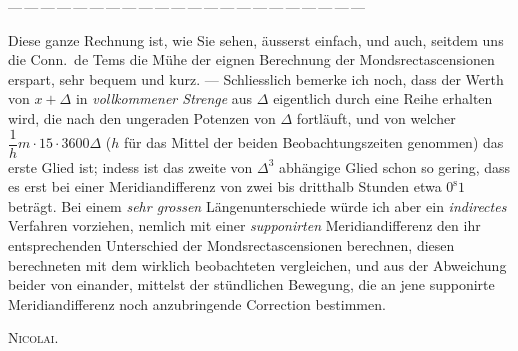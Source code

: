 \begin{center}
{\small ---\,---\,---\,---\,---\,---\,---\,---\,---\,---\,---\,---\,---\,---\,---\,---\,---\,---\,---\,---\,---\,---}
\end{center}

Diese ganze Rechnung ist, wie Sie sehen, äusserst einfach, und auch, seitdem uns die Conn.\ de Tems
die Mühe der eignen Berechnung der Mondsrectascensionen erspart, sehr bequem und kurz. ---
Schliesslich bemerke ich noch, dass der Werth von $x+\Delta$ in \emph{vollkommener Strenge} aus
$\Delta$ eigentlich durch eine Reihe erhalten wird, die nach den ungeraden Potenzen von $\Delta$
fortläuft, und von welcher $\dfrac{1}{h}m\cdot15\cdot3600\Delta$ ($h$ für das Mittel der beiden
Beobachtungszeiten genommen) das erste Glied ist; indess ist das zweite von $\Delta^3$ abhängige
Glied schon so gering, dass es erst bei einer Meridiandifferenz von zwei bis dritthalb Stunden etwa
$0^{\mathrm{s}}1$ beträgt. 
Bei einem \emph{sehr grossen} Längenunterschiede würde ich aber ein \emph{indirectes} Verfahren
vorziehen, nemlich mit einer \emph{supponirten} Meridiandifferenz den ihr entsprechenden Unterschied
der Mondsrectascensionen berechnen, diesen berechneten mit dem wirklich beobachteten vergleichen, und
aus der Abweichung beider von einander, mittelst der stündlichen Bewegung, die an jene supponirte
Meridiandifferenz noch anzubringende Correction bestimmen.

\begin{flushright}
\textsc{Nicolai.}
\end{flushright}
